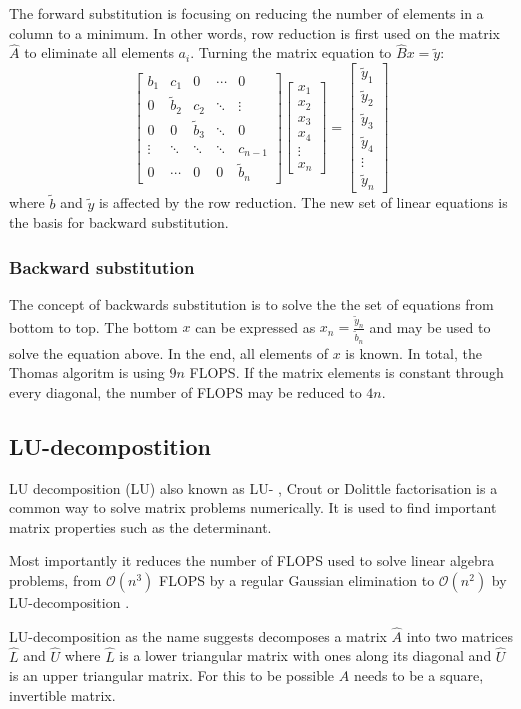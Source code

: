 \documentclass[twoside,twocolumn]{article}
\newcommand{\nl}{

\medskip
\noindent
}
\begin{document}
The forward substitution is focusing on reducing the number of elements in a column to a minimum. In other words, row reduction is first used on the matrix $\hat{A}$ to eliminate all elements $a_{i}$. Turning the matrix equation to $\hat{B}x=\tilde{y}$:
\begin{equation*}
\begin{bmatrix}
b_1&c_1&0&\cdots &0\\
0&\tilde{b}_2&c_2& \ddots & \vdots\\
0&0&\tilde{b}_3&\ddots&0\\
\vdots&\ddots&\ddots&\ddots&c_{n-1}\\
0&\cdots&0&0&\tilde{b}_n
\end{bmatrix}
\begin{bmatrix}
x_1\\x_2\\x_3\\x_4\\\vdots\\x_{n}
\end{bmatrix}=
\begin{bmatrix}
\tilde{y}_1\\\tilde{y}_2\\\tilde{y}_3\\\tilde{y}_4\\\vdots\\\tilde{y}_{n}
\end{bmatrix} 
\end{equation*}
where $\tilde{b}$ and $\tilde{y}$ is affected by the row reduction. The new set of linear equations is the basis for backward substitution.

\newpage
\subsubsection{Backward substitution}

The concept of backwards substitution is to solve the the set of equations from bottom to top. The bottom $x$ can be expressed as $x_n=\frac{\tilde{y}_n}{\tilde{b}_n}$ and may be used to solve the equation above. In the end, all elements of $x$ is known. In total, the Thomas algoritm is using $9n$ FLOPS. If the matrix elements is constant through every diagonal, the number of FLOPS may be reduced to $4n$.

\subsection{LU-decompostition}
LU decomposition (LU) also known as LU- , Crout or Dolittle factorisation \cite{linalg:lay}\cite{compfys} is a common way to solve matrix problems numerically. It is used to find important matrix properties such as the determinant.
\nl
Most importantly it reduces the number of FLOPS used to solve linear algebra problems, from 
$\mathcal{O}(n^3)$ FLOPS by a regular Gaussian elimination to $\mathcal{O}(n^2)$ by LU-decomposition \cite{compfys}.
\nl
LU-decomposition as the name suggests decomposes a matrix $\hat{A}$ into two matrices $\hat{L}$ and $\hat{U}$ where $\hat{L}$ is a lower triangular matrix with ones along its diagonal and $\hat{U}$ is an upper triangular matrix. For this to be possible $\hat{A}$ needs to be a square, invertible matrix.
\end{document}
